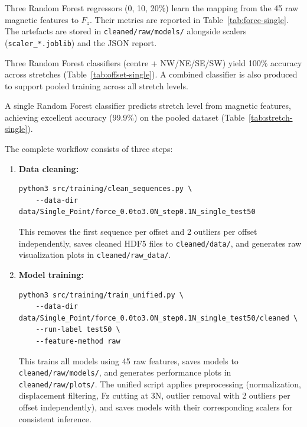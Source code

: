 \documentclass[11pt,a4paper]{article}
\begin{document}
\begin{description}[leftmargin=1.5em]
    \item[Per-stretch force regressors.] Three Random Forest regressors (0, 10, 20\%) learn the mapping
          from the 45 raw magnetic features to \(F_z\). Their metrics are reported in
          Table~\ref{tab:force-single}. The artefacts are stored in
          \texttt{cleaned/raw/models/} alongside scalers (\texttt{scaler\_*.joblib}) and the JSON report.
    \item[Per-stretch press location classifiers.] Three Random Forest classifiers (centre + NW/NE/SE/SW)
          yield 100\% accuracy across stretches (Table~\ref{tab:offset-single}). 
          A combined classifier is also produced to support pooled training across all stretch levels.
    \item[Stretch classifier.] A single Random Forest classifier predicts stretch level from magnetic features,
          achieving excellent accuracy (99.9\%) on the pooled dataset (Table~\ref{tab:stretch-single}).
    \item[Training workflow.] The complete workflow consists of three steps:
          \begin{enumerate}[leftmargin=1.5em]
              \item \textbf{Data cleaning:}
\begin{verbatim}
python3 src/training/clean_sequences.py \
    --data-dir data/Single_Point/force_0.0to3.0N_step0.1N_single_test50
\end{verbatim}
                    This removes the first sequence per offset and 2 outliers per offset independently, saves cleaned HDF5 files to \texttt{cleaned/data/}, and generates raw visualization plots in \texttt{cleaned/raw\_data/}.
              \item \textbf{Model training:}
\begin{verbatim}
python3 src/training/train_unified.py \
    --data-dir data/Single_Point/force_0.0to3.0N_step0.1N_single_test50/cleaned \
    --run-label test50 \
    --feature-method raw
\end{verbatim}
                    This trains all models using 45 raw features, saves models to \texttt{cleaned/raw/models/}, and generates performance plots in \texttt{cleaned/raw/plots/}. The unified script applies preprocessing (normalization, displacement filtering, Fz cutting at 3N, outlier removal with 2 outliers per offset independently),
                    and saves models with their corresponding scalers for consistent inference.
          \end{enumerate}
\end{description}
\end{document}
